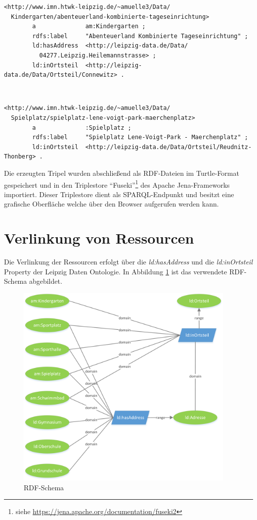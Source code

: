 \documentclass[parskip]{scrartcl}
\begin{document}
\begin{lstlisting}[caption={Beispielinstanz der Klasse Kindergarten}, label={list:example_kiga}]
<http://www.imn.htwk-leipzig.de/~amuelle3/Data/
  Kindergarten/abenteuerland-kombinierte-tageseinrichtung>
        a              am:Kindergarten ;
        rdfs:label     "Abenteuerland Kombinierte Tageseinrichtung" ;
        ld:hasAddress  <http://leipzig-data.de/Data/
          04277.Leipzig.Heilemannstrasse> ;
        ld:inOrtsteil  <http://leipzig-data.de/Data/Ortsteil/Connewitz> .
\end{lstlisting}
~
~
~
~
~
~
~

\begin{lstlisting}[caption={Beispielinstanz der Klasse Spielplatz}, label={list:example_spielpl}, breaklines=true]
<http://www.imn.htwk-leipzig.de/~amuelle3/Data/
  Spielplatz/spielplatz-lene-voigt-park-maerchenplatz>
        a              :Spielplatz ;
        rdfs:label     "Spielplatz Lene-Voigt-Park - Maerchenplatz" ;
        ld:inOrtsteil  <http://leipzig-data.de/Data/Ortsteil/Reudnitz-Thonberg> .
\end{lstlisting}

Die erzeugten Tripel wurden abschließend als RDF-Dateien im Turtle-Format gespeichert und in den Triplestore "`Fuseki"'\footnote{siehe \url{https://jena.apache.org/documentation/fuseki2}} des Apache Jena-Frameworks importiert.
Dieser Triplestore dient als SPARQL-Endpunkt und besitzt eine grafische Oberfläche welche über den Browser aufgerufen werden kann.

\section{Verlinkung von Ressourcen}
Die Verlinkung der Ressourcen erfolgt über die \textit{ld:hasAddress} und die \textit{ld:inOrtsteil} Property der Leipzig Daten Ontologie. In Abbildung \ref{figure_schema} ist das verwendete RDF-Schema abgebildet.


\begin{figure}[h]
 \centering
 \includegraphics[width=0.95\textwidth]{schema.png}
 \caption{RDF-Schema}
 \label{figure_schema}
\end{figure}
\end{document}
